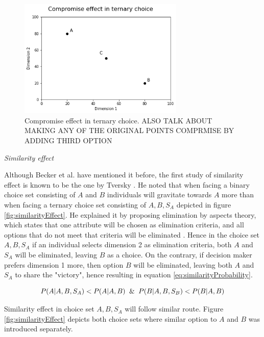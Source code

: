 \documentclass[a4paper,12pt]{article}
\newcommand{\citeyearonly}[1]{\citeyearpar{#1}}
\begin{document}
\begin{figure}[h]
    \centering
    \includegraphics[width=0.7\textwidth]{staticFiles/compromiseEffect.png}
    \caption{Compromise effect in ternary choice. ALSO TALK ABOUT MAKING ANY OF THE ORIGINAL POINTS COMPRMISE BY ADDING THIRD OPTION} %
    \label{fig:compromiseEffect} %

\end{figure}

\textit{Similarity effect}

Although Becker et al. \citeyearonly{becker1964measuring} have mentioned it before, the first study of similarity effect is known to be the one by Tversky \citep{tversky1972elimination}. He noted that when facing a binary choice set consisting of $A$ and $B$ individuals will gravitate towards $A$ more than when facing a ternary choice set consisting of ${A, B, S_A}$ depicted in figure \ref{fig:similarityEffect}. He explained it by proposing elimination by aspects theory, which states that one attribute will be chosen as elimination criteria, and all options that do not meet that criteria will be eliminated \citep{tversky1972elimination}. Hence in the choice set ${A, B, S_A}$ if an individual selects dimension 2 as elimination criteria, both $A$ and $S_A$ will be eliminated, leaving $B$ as a choice. On the contrary, if decision maker prefers dimension 1 more, then option 
$B$ will be eliminated, leaving both $A$ and $S_A$ to share the "victory", hence resulting in equation \ref{eq:similarityProbability}.

\begin{equation}\label{eq:similarityProbability}
    P(A|A,B,S_A) < P(A|A,B) \And  P(B|A,B,S_B) < P(B|A,B)
\end{equation}

Similarity effect in choice set ${A, B, S_A}$ will follow similar route. Figure \ref{fig:similarityEffect} depicts both choice sets where similar option to $A$ and $B$ was introduced separately.
\end{document}
